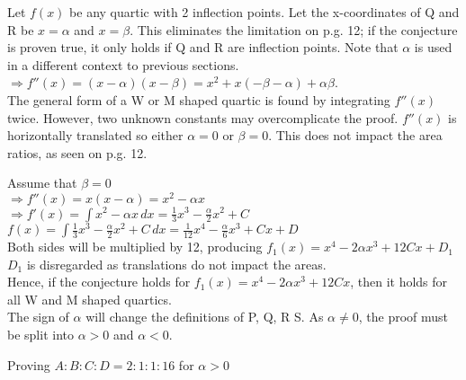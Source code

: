 \documentclass{homework}
\begin{document}
\begin{flushleft}
Let $f(x)$ be any quartic with 2 inflection points. Let the x-coordinates of Q and R be $x=\alpha$ and $x=\beta$. This eliminates the limitation on p.g. 12; if the conjecture is proven true, it only holds if Q and R are inflection points. Note that $\alpha$ is used in a different context to previous sections. \vspace{0.8em}\\
$\Rightarrow f''(x)=(x-\alpha)(x-\beta)=x^2+x(-\beta-\alpha)+\alpha \beta$. \vspace{0.8em} \\
The general form of a W or M shaped quartic is found by integrating $f''(x)$ twice. However, two unknown constants may overcomplicate the proof. $f''(x)$ is horizontally translated so either $\alpha=0$ or $\beta=0$. This does not impact the area ratios, as seen on p.g. 12. \vspace{0.8em} \\
\begin{paracol}{2}
Assume that $\beta=0$ \vspace{0.8em}\\
$\Rightarrow f''(x)=x(x-\alpha)=x^2-\alpha x$ \vspace{0.8em}\\
$\Rightarrow f'(x)=\int x^2-\alpha x \, dx= 
\frac{1}{3}x^3-\frac{\alpha
}{2}x^2+C$ \vspace{0.8em}\\
$ f(x)=\int \frac{1}{3}x^3-\frac{\alpha}{2}x^2+C\, dx=\frac{1}{12}x^4-\frac{\alpha}{6}x^3+Cx + D$ \vspace{0.8em}\\
Both sides will be multiplied by 12, producing $f_1(x)=x^4-2\alpha x^3+12Cx + D_1$ \\ \switchcolumn
$D_1$ is disregarded as translations do not impact the areas. \vspace{0.5em}\\ 
Hence, if the conjecture holds for $f_1(x)=x^4-2\alpha x^3+12Cx$, then it holds for all W and M shaped quartics. \vspace{0.5em}\\
The sign of $\alpha$ will change the definitions of P, Q, R S. As $\alpha \neq0$, the proof must be split into $\alpha>0$ and $\alpha<0$.
\end{paracol}
\newpage
\large{Proving $A:B:C:D=2:1:1:16$ for $\alpha>0$} \vspace{0.7em} \\
\normalsize{}

\end{flushleft}
\end{document}

